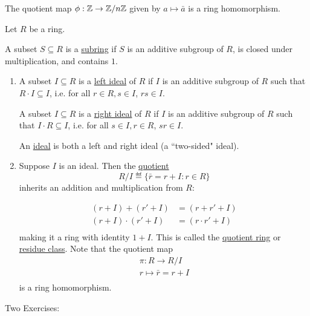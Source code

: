 \documentclass[x11names,reqno,14pt]{extarticle}
\begin{document}
\exm The quotient map $\phi:\mathbb{Z}\to\mathbb{Z}/n\mathbb{Z}$ given by $a\mapsto\bar{a}$ is a ring homomorphism. 

Let $R$ be a ring. 

 A subset $S\subseteq R$ is a \underline{subring} if $S$ is an additive subgroup of $R$, is closed under multiplication, and contains $1$. 


\begin{enumerate}

\item

A subset $I \subseteq R$ is a \underline{left ideal} of $R$ if $I$ is an additive subgroup of $R$ such that $R \cdot I \subseteq I$, i.e. for all $r \in R, s \in I$, $rs \in I$. 

A subset $I \subseteq R$ is a \underline{right ideal} of $R$ if $I$ is an additive subgroup of $R$ such that $I \cdot R \subseteq I$, i.e. for all $s \in I, r \in R$, $sr \in I$. 

An \underline{ideal} is both a left and right ideal (a ``two-sided" ideal). 

\item Suppose $I$ is an ideal. Then the \underline{quotient} 
\[
R/I \eqdef \{\bar{r} = r + I: r \in R\}
\]
inherits an addition and multiplication from $R:$ 

\begin{align*}
(r + I) + (r' + I) & = (r + r' + I) \\
(r + I)\cdot(r' + I) & = (r\cdot r' + I)\\
\end{align*}
making it a ring with identity $1 + I$. This is called the \underline{quotient ring} or \underline{residue class}. Note that the quotient map
\begin{align*}
\pi:R\to R/I \\
r\mapsto\bar{r} = r + I \\
\end{align*}
is a ring homomorphism. 


\end{enumerate}

Two Exercises: 
\end{document}

